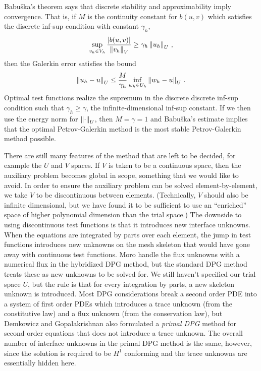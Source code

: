 \documentclass[Dissertation.tex]{subfiles}
\begin{document}
Babu\v{s}ka's theorem\cite{Babuska70} says that discrete stability and approximability imply convergence.
That is, if $M$ is the continuity constant for $b(u,v)$ which satisfies the discrete inf-sup condition with constant $\gamma_h$,
\[
\sup_{v_h\in V_h}\frac{|b(u,v)|}{\left\| v_h \right\|_V}\geq\gamma_h\left\| u_h \right\|_U\,,
\]
then the Galerkin error satisfies the bound
\[
\left\| u_h-u \right\|_U\leq\frac{M}{\gamma_h}\inf_{w_h\in U_h}\left\| w_h-u \right\|_U\,.
\]
Optimal test functions realize the supremum in the discrete discrete inf-sup condition such that $\gamma_h\geq\gamma$,
the infinite-dimensional inf-sup constant.
If we then use the energy norm for $\left\| \cdot \right\|_U$, then $M=\gamma=1$ and Babu\v{s}ka's estimate implies that
the optimal Petrov-Galerkin method is the most stable Petrov-Galerkin method possible.

There are still many features of the method that are left to be decided, for example the $U$ and $V$ spaces.
If $V$ is taken to be a continuous space, then the auxiliary problem becomes global in scope, something that we would like to avoid.
In order to ensure the auxiliary problem can be solved element-by-element, we take $V$ to be discontinuous between elements.
(Technically, $V$ should also be infinite dimensional, but we have found it to be sufficient to use an ``enriched'' space of higher
polynomial dimension than the trial space.)
The downside to using discontinuous test functions is that it introduces new interface unknowns.
When the equations are integrated by parts over each element, the jump in test functions introduces new unknowns on the mesh skeleton
that would have gone away with continuous test functions.
Moro \etal\cite{MoroNguyenPeraire11} handle the flux unknowns with a numerical flux in the hybridized DPG method, but the standard DPG method treats
these as new unknowns to be solved for.
We still haven't specified our trial space $U$, but the rule is that for every integration by parts, a new skeleton unknown is introduced.
Most DPG considerations break a second order PDE into a system of first order PDEs which introduces a trace unknown (from the constitutive law)
and a flux unknown (from the conservation law), but Demkowicz and Gopalakrishnan also formulated a \emph{primal DPG} method for second order equations
that does not introduce a trace unknown.
The overall number of interface unknowns in the primal DPG method is the same, however, since the solution is required to be $H^1$ conforming
and the trace unknowns are essentially hidden here.
\end{document}
